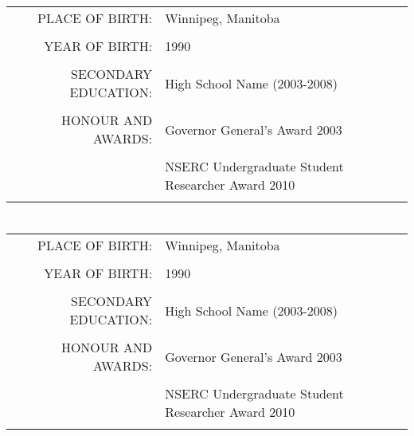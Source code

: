 \section*{\centering \StudentNameC}
\begin{table}[htdp]
\begin{center}
\begin{tabular}{rl}
	PLACE OF BIRTH: 
		& Winnipeg, Manitoba\\ \\
	YEAR OF BIRTH: 
		& 1990 \\ \\
	SECONDARY EDUCATION: 
		& High School Name (2003-2008) \\ \\
	HONOUR AND AWARDS: 
		& Governor General's Award 2003 \\ \\
		& NSERC Undergraduate Student Researcher Award 2010 \\ \\
\end{tabular}
\end{center}
\end{table}
\newpage

\section*{\centering \StudentNameD}
\begin{table}[htdp]
\begin{center}
\begin{tabular}{rl}
	PLACE OF BIRTH: 
		& Winnipeg, Manitoba\\ \\
	YEAR OF BIRTH: 
		& 1990 \\ \\
	SECONDARY EDUCATION: 
		& High School Name (2003-2008) \\ \\
	HONOUR AND AWARDS: 
		& Governor General's Award 2003 \\ \\
		& NSERC Undergraduate Student Researcher Award 2010 \\ \\
\end{tabular}
\end{center}
\end{table}
\newpage

